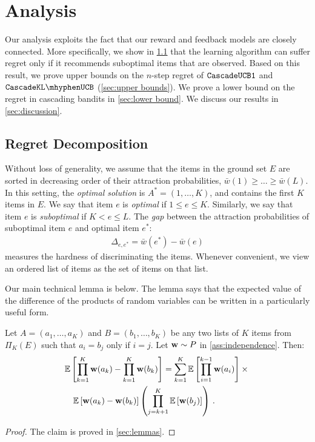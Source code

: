 
\section{Analysis}
\label{sec:analysis}

Our analysis exploits the fact that our reward and feedback models are closely connected. More specifically, we show in \cref{sec:regret decomposition} that the learning algorithm can suffer regret only if it recommends suboptimal items that are observed. Based on this result, we prove upper bounds on the $n$-step regret of ${\tt CascadeUCB1}$ and $\cascadeklucb$ (\cref{sec:upper bounds}). We prove a lower bound on the regret in cascading bandits in \cref{sec:lower bound}. We discuss our results in \cref{sec:discussion}.


\subsection{Regret Decomposition}
\label{sec:regret decomposition}

Without loss of generality, we assume that the items in the ground set $E$ are sorted in decreasing order of their attraction probabilities, $\bar{w}(1) \geq \ldots \geq \bar{w}(L)$. In this setting, the \emph{optimal solution} is $A^\ast = (1, \dots, K)$, and contains the first $K$ items in $E$. We say that item $e$ is \emph{optimal} if $1 \leq e \leq K$. Similarly, we say that item $e$ is \emph{suboptimal} if $K < e \leq L$. The \emph{gap} between the attraction probabilities of suboptimal item $e$ and optimal item $e^\ast$:
\begin{align}
  \Delta_{e, e^\ast} = \bar{w}(e^\ast) - \bar{w}(e)
  \label{eq:gap}
\end{align}
measures the hardness of discriminating the items. Whenever convenient, we view an ordered list of items as the set of items on that list.

Our main technical lemma is below. The lemma says that the expected value of the difference of the products of random variables can be written in a particularly useful form.

\begin{lemma}
\label{lem:modular decomposition} Let $A = (a_1, \dots, a_K)$ and $B = (b_1, \dots, b_K)$ be any two lists of $K$ items from $\Pi_K(E)$ such that $a_i = b_j$ only if $i = j$. Let $\mathbf{w} \sim P$ in \cref{ass:independence}. Then:
\begin{align*}
  & \mathbb{E} \left[\prod_{k = 1}^K \mathbf{w}(a_k) - \prod_{k = 1}^K \mathbf{w}(b_k)\right] =
  \sum_{k = 1}^K \mathbb{E} \left[\prod_{i = 1}^{k - 1} \mathbf{w}(a_i)\right] \times {} \\
  & \quad \mathbb{E} \left[\mathbf{w}(a_k) - \mathbf{w}(b_k)\right] \left(\prod_{j = k + 1}^K \mathbb{E} \left[\mathbf{w}(b_j)\right]\right)\,.
\end{align*}
\end{lemma}
\begin{proof}
The claim is proved in \cref{sec:lemmas}.
\end{proof}

